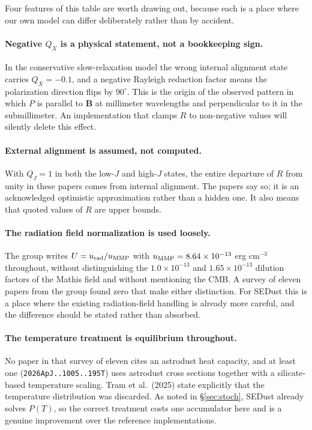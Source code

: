 \documentclass{my_memo}
\let\mathbf\boldsymbol
\newcommand{\code}[1]{\texttt{#1}}
\begin{document}
Four features of this table are worth drawing out, because each is a
place where our own model can differ deliberately rather than by
accident.

\paragraph{Negative $Q_X$ is a physical statement, not a bookkeeping
sign.} In the conservative slow-relaxation model the wrong internal
alignment state carries $Q_X = -0.1$, and a negative Rayleigh reduction
factor means the polarization direction flips by $90^\circ$. This is the
origin of the observed pattern in which $P$ is parallel to $\mathbf{B}$
at millimeter wavelengths and perpendicular to it in the submillimeter.
An implementation that clamps $R$ to non-negative values will silently
delete this effect.

\paragraph{External alignment is assumed, not computed.} With $Q_J = 1$
in both the low-$J$ and high-$J$ states, the entire departure of $R$
from unity in these papers comes from internal alignment. The papers say
so; it is an acknowledged optimistic approximation rather than a hidden
one. It also means that quoted values of $R$ are upper bounds.

\paragraph{The radiation field normalization is used loosely.} The group
writes $U = u_{\rm rad}/u_{\rm MMP}$ with
$u_{\rm MMP} = 8.64\times10^{-13}$ erg cm$^{-3}$ throughout, without
distinguishing the $1.0\times10^{-13}$ and $1.65\times10^{-13}$ dilution
factors of the Mathis field and without mentioning the CMB. A survey of
eleven papers from the group found zero that make either distinction.
For SEDust this is a place where the existing radiation-field handling
is already more careful, and the difference should be stated rather than
absorbed.

\paragraph{The temperature treatment is equilibrium throughout.} No
paper in that survey of eleven cites an astrodust heat capacity, and at
least one (\code{2026ApJ..1005..195T}) uses astrodust cross sections
together with a silicate-based temperature scaling. Tram et al.\ (2025)
state explicitly that the temperature distribution was discarded. As
noted in \S\ref{sec:stoch}, SEDust already solves $P(T)$, so the correct
treatment costs one accumulator here and is a genuine improvement over
the reference implementations.
\end{document}
